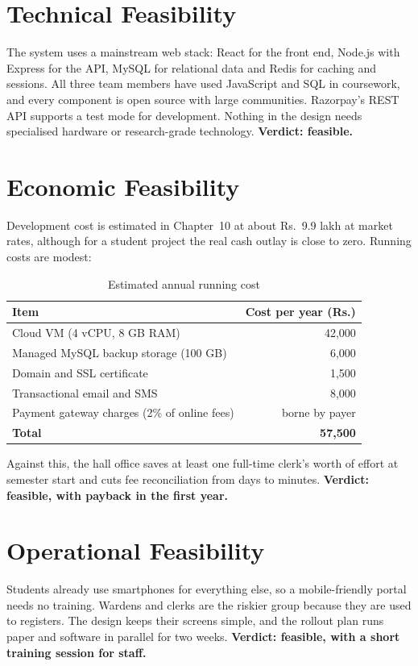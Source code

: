 \documentclass[11pt,a4paper]{report}
\newcommand{\rupee}{Rs.}
\begin{document}
\section{Technical Feasibility}
The system uses a mainstream web stack: React for the front end, Node.js with Express for the API, MySQL for relational data and Redis for caching and sessions. All three team members have used JavaScript and SQL in coursework, and every component is open source with large communities. Razorpay's REST API supports a test mode for development. Nothing in the design needs specialised hardware or research-grade technology. \textbf{Verdict: feasible.}

\section{Economic Feasibility}
Development cost is estimated in Chapter~10 at about \rupee\ 9.9 lakh at market rates, although for a student project the real cash outlay is close to zero. Running costs are modest:

\begin{table}[H]
\centering\small
\caption{Estimated annual running cost}\label{tab:runcost}
\begin{tabular}{lr}
\toprule
\textbf{Item} & \textbf{Cost per year (\rupee)}\\
\midrule
Cloud VM (4 vCPU, 8 GB RAM) & 42,000\\
Managed MySQL backup storage (100 GB) & 6,000\\
Domain and SSL certificate & 1,500\\
Transactional email and SMS & 8,000\\
Payment gateway charges (2\% of online fees) & borne by payer\\
\midrule
\textbf{Total} & \textbf{57,500}\\
\bottomrule
\end{tabular}
\end{table}

Against this, the hall office saves at least one full-time clerk's worth of effort at semester start and cuts fee reconciliation from days to minutes. \textbf{Verdict: feasible, with payback in the first year.}

\section{Operational Feasibility}
Students already use smartphones for everything else, so a mobile-friendly portal needs no training. Wardens and clerks are the riskier group because they are used to registers. The design keeps their screens simple, and the rollout plan runs paper and software in parallel for two weeks. \textbf{Verdict: feasible, with a short training session for staff.}
\end{document}
